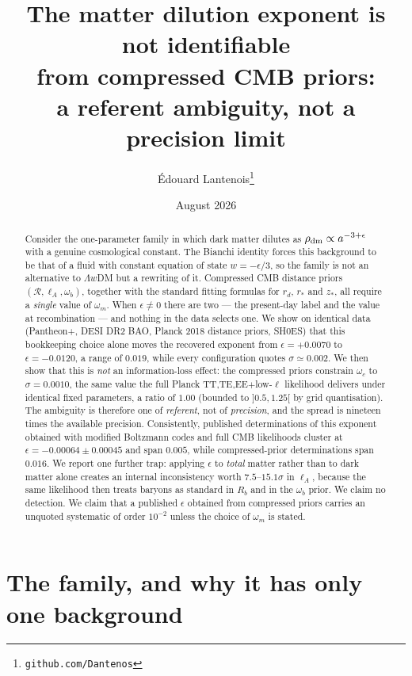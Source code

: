 \documentclass[11pt,a4paper]{article}
\title{\bf The matter dilution exponent is not identifiable\\
from compressed CMB priors:\\
a referent ambiguity, not a precision limit}
\author{\'Edouard Lantenois\thanks{\texttt{github.com/Dantenos}}}
\date{August 2026}
\begin{document}
\maketitle

\begin{abstract}
\noindent
Consider the one-parameter family in which dark matter dilutes as
$\rho_{\rm dm}\propto a^{-3+\epsilon}$ with a genuine cosmological constant. The Bianchi
identity forces this background to be that of a fluid with constant equation of state
$w=-\epsilon/3$, so the family is not an alternative to $\Lambda w$DM but a rewriting of it.
Compressed CMB distance priors $(\mathcal{R}, \ell_A, \omega_b)$, together with the standard
fitting formulas for $r_d$, $r_\ast$ and $z_\ast$, all require a \emph{single} value of
$\omega_m$. When $\epsilon\neq0$ there are two --- the present-day label and the value at
recombination --- and nothing in the data selects one. We show on identical data
(Pantheon+, DESI DR2 BAO, Planck 2018 distance priors, SH0ES) that this bookkeeping choice
alone moves the recovered exponent from $\epsilon=+0.0070$ to $\epsilon=-0.0120$, a range of
$0.019$, while every configuration quotes $\sigma\simeq0.002$. We then show that this is
\emph{not} an information-loss effect: the compressed priors constrain $\omega_c$ to
$\sigma=0.0010$, the same value the full Planck TT,TE,EE$+$low-$\ell$ likelihood delivers
under identical fixed parameters, a ratio of $1.00$ (bounded to $]0.5,1.25[$ by grid
quantisation). The ambiguity is therefore one of \emph{referent}, not of \emph{precision},
and the spread is nineteen times the available precision. Consistently, published
determinations of this exponent obtained with modified Boltzmann codes and full CMB
likelihoods cluster at $\epsilon = -0.00064\pm0.00045$ and span $0.005$, while
compressed-prior determinations span $0.016$. We report one further trap: applying
$\epsilon$ to \emph{total} matter rather than to dark matter alone creates an internal
inconsistency worth $7.5$--$15.1\sigma$ in $\ell_A$, because the same likelihood then treats
baryons as standard in $R_b$ and in the $\omega_b$ prior. We claim no detection. We claim
that a published $\epsilon$ obtained from compressed priors carries an unquoted systematic
of order $10^{-2}$ unless the choice of $\omega_m$ is stated.
\end{abstract}

\section{The family, and why it has only one background}
\label{sec:famille}
\end{document}
